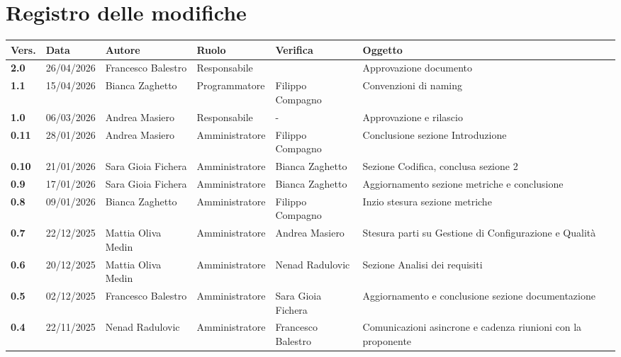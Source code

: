 \documentclass[a4paper,12pt]{article}
\begin{document}


\section*{Registro delle modifiche}
    \begin{xltabular}{\textwidth}{|l|l|X|l|X|X|}
        \hline
        \textbf{Vers.} & \textbf{Data} & \textbf{Autore} & \textbf{Ruolo} & \textbf{Verifica} & \textbf{Oggetto} \\
        \hline
        \endhead

        \endfoot

        \hline
        \endlastfoot
        \textbf{2.0} & 26/04/2026 & Francesco Balestro & Responsabile &  & Approvazione documento \\
        \hline
        \textbf{1.1} & 15/04/2026 & Bianca Zaghetto & Programmatore & Filippo Compagno & Convenzioni di naming \\
        \hline
        \textbf{1.0} & 06/03/2026 & Andrea Masiero & Responsabile & - & Approvazione e rilascio \\
        \hline
        \textbf{0.11} & 28/01/2026 & Andrea Masiero & Amministratore & Filippo Compagno & Conclusione sezione Introduzione \\
        \hline
        \textbf{0.10} & 21/01/2026 & Sara Gioia Fichera & Amministratore & Bianca Zaghetto & Sezione Codifica, conclusa sezione 2 \\
        \hline
        \textbf{0.9} & 17/01/2026 & Sara Gioia Fichera & Amministratore & Bianca Zaghetto & Aggiornamento sezione metriche e conclusione \\
        \hline
        \textbf{0.8} & 09/01/2026 & Bianca Zaghetto & Amministratore & Filippo Compagno & Inzio stesura sezione metriche \\
        \hline
        \textbf{0.7} & 22/12/2025 & Mattia Oliva Medin & Amministratore & Andrea Masiero & Stesura parti su Gestione di Configurazione e Qualità \\
        \hline
        \textbf{0.6} & 20/12/2025 & Mattia Oliva Medin & Amministratore & Nenad Radulovic & Sezione Analisi dei requisiti \\
        \hline
        \textbf{0.5} & 02/12/2025 & Francesco Balestro & Amministratore & Sara Gioia Fichera & Aggiornamento e conclusione sezione documentazione \\
        \hline
        \textbf{0.4} & 22/11/2025 & Nenad Radulovic & Amministratore & Francesco Balestro & Comunicazioni asincrone e cadenza riunioni con la proponente \\

\end{xltabular}
\end{document}
